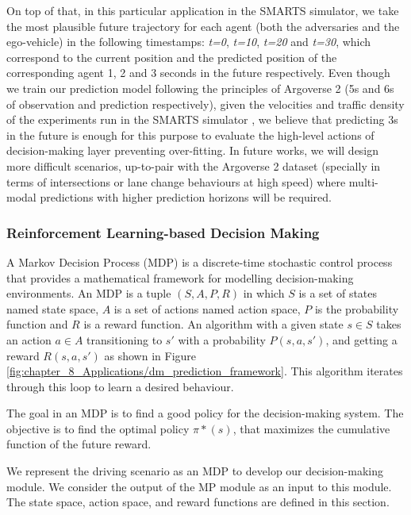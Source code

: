 On top of that, in this particular application in the SMARTS simulator, we take the most plausible future trajectory for each agent (both the adversaries and the ego-vehicle) in the following timestamps: \textit{t=0}, \textit{t=10}, \textit{t=20} and \textit{t=30}, which correspond to the current position and the predicted position of the corresponding agent 1, 2 and 3 seconds in the future respectively. Even though we train our prediction model following the principles of Argoverse 2 (5s and 6s of observation and prediction respectively), given the velocities and traffic density of the experiments run in the SMARTS simulator , we believe that predicting 3s in the future is enough for this purpose to evaluate the high-level actions of decision-making layer preventing over-fitting. In future works, we will design more difficult scenarios, up-to-pair with the Argoverse 2 dataset (specially in terms of intersections or lane change behaviours at high speed) where multi-modal predictions with higher prediction horizons will be required.

\subsubsection{Reinforcement Learning-based Decision Making}
\label{subsubsec:8_decision_making_our_approach_dm}

A Markov Decision Process (MDP) is a discrete-time stochastic control process that provides a mathematical framework for modelling decision-making environments. An MDP is a tuple $(S,A,P,R)$ in which $S$ is a set of states named state space, $A$ is a set of actions named action space, $P$ is the probability function and $R$ is a reward function. An algorithm with a given state $s \in S$ takes an action $a \in A$ transitioning to $s'$ with a probability $P(s,a,s')$, and getting a reward $R(s,a,s')$ as shown in Figure \ref{fig:chapter_8_Applications/dm_prediction_framework}. This algorithm iterates through this loop to learn a desired behaviour. 

The goal in an MDP is to find a good policy for the decision-making system. The objective is to find the optimal policy $\pi*(s)$, that maximizes the cumulative function of the future reward.

We represent the driving scenario as an MDP to develop our decision-making module. We consider the output of the MP module as an input to this module. The state space, action space, and reward functions are defined in this section.

